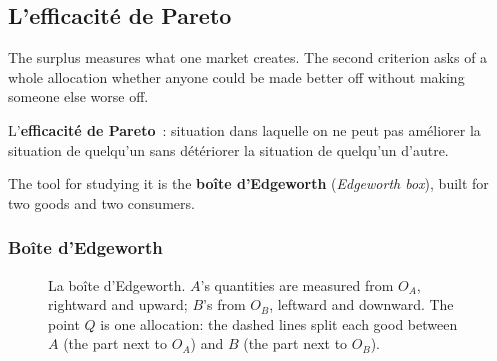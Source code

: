 \subsection{L'efficacité de Pareto}

The surplus measures what one market creates. The second criterion asks of a whole
allocation whether anyone could be made better off without making someone else
worse off.

\begin{definition}
  L'\textbf{efficacité de Pareto}~: situation dans laquelle on ne peut pas
  améliorer la situation de quelqu'un sans détériorer la situation de quelqu'un
  d'autre.
\end{definition}

The tool for studying it is the \textbf{boîte d'Edgeworth} (\textit{Edgeworth
box}), built for two goods and two consumers.

\subsubsection{Boîte d'Edgeworth}

\begin{figure}[h!]
  \centering
  \caption*{\small La boîte d'Edgeworth. $A$'s quantities are measured from $O_A$,
  rightward and upward; $B$'s from $O_B$, leftward and downward. The point $Q$ is one
  allocation: the dashed lines split each good between $A$ (the part next to $O_A$)
  and $B$ (the part next to $O_B$).}
\end{figure}

